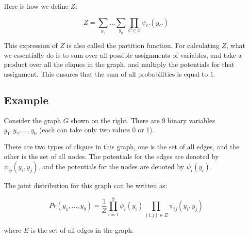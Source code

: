\documentclass[a4paper,12pt]{article}
\begin{document}
Here is how we define $Z$:

\[
Z = \sum_{y_1} \dots \sum_{y_n} \prod_{C \in \mathcal{C}} \psi_C(y_C)
\]

This expression of $Z$ is also called the partition function. For calculating $Z$, what we essentially do is to sum over all possible assignments of variables, and take a product over all the cliques in the graph, and multiply the potentials for that assignment. This ensures that the sum of all probabilities is equal to 1.


\subsection{Example}
\begin{minipage}{0.55\textwidth} 
    Consider the graph $G$ shown on the right. There are 9 binary variables $y_1, y_2, \dots, y_9$ (each can take only two values 0 or 1).  

    There are two types of cliques in this graph, one is the set of all edges, and the other is the set of all nodes. The potentials for the edges are denoted by $\psi_{ij}(y_i, y_j)$, and the potentials for the nodes are denoted by $\psi_i(y_i)$.

    The joint distribution for this graph can be written as:

    \[
    Pr(y_1, \dots, y_9) = \frac{1}{Z} \prod_{i=1}^{9} \psi_i(y_i) \prod_{(i,j) \in E} \psi_{ij}(y_i, y_j)
    \]

    where $E$ is the set of all edges in the graph.

\end{minipage}
\hfill 
\begin{minipage}{0.40\textwidth} 
\end{minipage}
\end{document}

